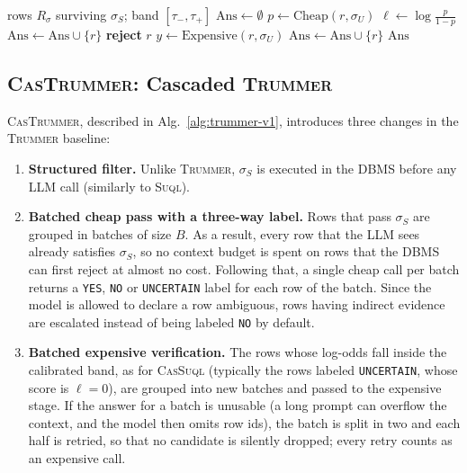 \documentclass[sigconf]{acmart}
\begin{document}
\begin{algorithm}[h]
\caption{\textsc{CasSuql} (row-level cascade, $B{=}1$)}
\label{alg:suql-v1}
\begin{algorithmic}[1]
\Require rows $R_\sigma$ surviving $\sigma_S$; band $[\tau_-,\tau_+]$
\State $\mathrm{Ans} \gets \emptyset$
  \State $p \gets \mathrm{Cheap}(r, \sigma_U)$ 
  \State $\ell \gets \log\frac{p}{1-p}$
  \If{$\ell \ge \tau_+$}
    \State $\mathrm{Ans} \gets \mathrm{Ans} \cup \{r\}$ 
  \ElsIf{$\ell \le \tau_-$}
    \State \textbf{reject} $r$ 
  \Else
    \State $y \gets \mathrm{Expensive}(r, \sigma_U)$ 
     $\mathrm{Ans} \gets \mathrm{Ans} \cup \{r\}$ \EndIf
  \EndIf
\EndFor
\State \Return $\mathrm{Ans}$
\end{algorithmic}
\end{algorithm}

\subsection{\textsc{CasTrummer}: Cascaded \textsc{Trummer}}
\label{sec:trummer-v1}
\textsc{CasTrummer}, described in Alg.~\ref{alg:trummer-v1}, introduces three changes in the \textsc{Trummer} baseline:

\begin{enumerate}
  \item \textbf{Structured filter.} Unlike \textsc{Trummer}, $\sigma_S$ is executed in the DBMS before any LLM call (similarly to \textsc{Suql}).
  \item \textbf{Batched cheap pass with a three-way label.} Rows that pass $\sigma_S$ are grouped in batches of size $B$. As a result, every row that the LLM sees already satisfies $\sigma_S$, so no context budget is spent on rows that the DBMS can first reject at almost no cost. Following that, a single cheap call per batch returns a \texttt{YES}, \texttt{NO} or \texttt{UNCERTAIN} label for each row of the batch. Since the model is allowed to declare a row ambiguous, rows having indirect evidence are escalated instead of being labeled \texttt{NO} by default.
  \item \textbf{Batched expensive verification.} The rows whose log-odds fall inside the calibrated band, as for \textsc{CasSuql} (typically the rows labeled \texttt{UNCERTAIN}, whose score is $\ell=0$), are grouped into new batches and passed to the expensive stage. If the answer for a batch is unusable (a long prompt can overflow the context, and the model then omits row ids), the batch is split in two and each half is retried, so that no candidate is silently dropped; every retry counts as an expensive call.
\end{enumerate}
\end{document}
